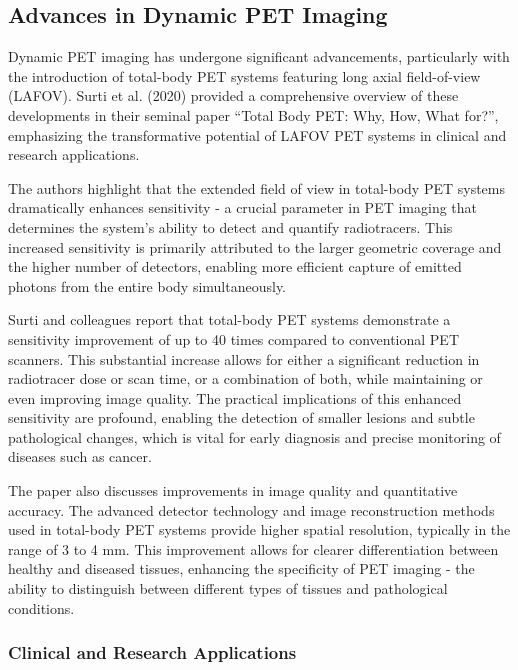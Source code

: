 \subsection{Advances in Dynamic PET Imaging}

Dynamic PET imaging has undergone significant advancements, particularly with the introduction of total-body PET systems featuring long axial field-of-view (LAFOV). Surti et al. (2020) \cite{surti2020} provided a comprehensive overview of these developments in their seminal paper ``Total Body PET: Why, How, What for?'', emphasizing the transformative potential of LAFOV PET systems in clinical and research applications.

The authors highlight that the extended field of view in total-body PET systems dramatically enhances sensitivity - a crucial parameter in PET imaging that determines the system's ability to detect and quantify radiotracers. This increased sensitivity is primarily attributed to the larger geometric coverage and the higher number of detectors, enabling more efficient capture of emitted photons from the entire body simultaneously.

Surti and colleagues report that total-body PET systems demonstrate a sensitivity improvement of up to 40 times compared to conventional PET scanners. This substantial increase allows for either a significant reduction in radiotracer dose or scan time, or a combination of both, while maintaining or even improving image quality. The practical implications of this enhanced sensitivity are profound, enabling the detection of smaller lesions and subtle pathological changes, which is vital for early diagnosis and precise monitoring of diseases such as cancer.

The paper also discusses improvements in image quality and quantitative accuracy. The advanced detector technology and image reconstruction methods used in total-body PET systems provide higher spatial resolution, typically in the range of 3 to 4 mm. This improvement allows for clearer differentiation between healthy and diseased tissues, enhancing the specificity of PET imaging - the ability to distinguish between different types of tissues and pathological conditions.

\subsubsection{Clinical and Research Applications}


